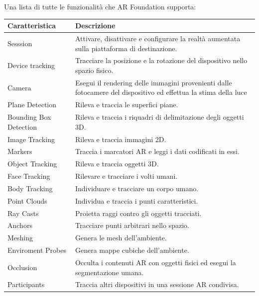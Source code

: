 \begin{center}
  Una lista di tutte le funzionalità che AR Foundation supporta:

    \begin{tabular}{| l | p{10cm} |}
      \hline
      \rowcolor{gray!30}
      \textbf{Caratteristica} & \textbf{Descrizione} \\ 
      \hline
      Sesssion & Attivare, disattivare e configurare la realtà aumentata sulla piattaforma di destinazione. \\ 
      \hline
      Device tracking & Tracciare la posizione e la rotazione del dispositivo nello spazio fisico. \\ 
      \hline
      Camera & Esegui il rendering delle immagini provenienti dalle fotocamere del dispositivo ed effettua la stima della luce \\ 
      \hline
      Plane Detection & Rileva e traccia le superfici piane. \\ 
      \hline
      Bounding Box Detection & Rileva e traccia i riquadri di delimitazione degli oggetti 3D. \\ 
      \hline
      Image Tracking & Rileva e traccia immagini 2D.\\ 
      \hline
      Markers & Traccia i marcatori AR e leggi i dati codificati in essi.\\ 
      \hline
      Object Tracking & Rileva e traccia oggetti 3D. \\ 
      \hline
      Face Tracking & Rilevare e tracciare i volti umani. \\ 
      \hline
      Body Tracking & Individuare e tracciare un corpo umano.\\ 
      \hline
      Point Clouds & Individua e traccia i punti caratteristici. \\ 
      \hline
      Ray Casts & Proietta raggi contro gli oggetti tracciati. \\
     \hline
      Anchors & Tracciare punti arbitrari nello spazio. \\
      \hline
      Meshing & Genera le mesh dell'ambiente.\\
      \hline
      Enviroment Probes & Genera mappe cubiche dell'ambiente. \\
      \hline
      Occlusion & Occulta i contenuti AR con oggetti fisici ed esegui la segmentazione umana. \\
      \hline
      Participants & Traccia altri dispositivi in una sessione AR condivisa. \\
      \hline
    \end{tabular}
\end{center}


